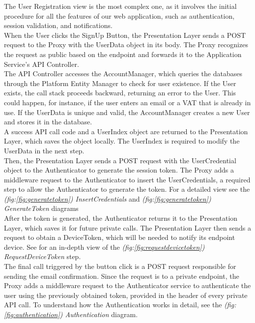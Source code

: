 The User Registration view is the most complex one, as it involves the initial procedure for all the features of our web application, such as authentication, session validation, and notifications.\\
When the User clicks the SignUp Button, the Presentation Layer sends a POST request to the Proxy with the UserData object in its body. The Proxy recognizes the request as public based on the endpoint and forwards it to the Application Service's API Controller.\\
The API Controller accesses the AccountManager, which queries the databases through the Platform Entity Manager to check for user existence. If the User exists, the call stack proceeds backward, returning an error to the User. This could happen, for instance, if the user enters an email or a VAT that is already in use. If the UserData is unique and valid, the AccountManager creates a new User and stores it in the database.\\
A success API call code and a UserIndex object are returned to the Presentation Layer, which saves the object locally. The UserIndex is required to modify the UserData in the next step.\\
Then, the Presentation Layer sends a POST request with the UserCredential object to the Authenticator to generate the session token. The Proxy adds a middleware request to the Authenticator to insert the UserCredentials, a required step to allow the Authenticator to generate the token. For a detailed view see the \textit{(fig:\ref{fig:generatetoken}) InsertCredentials} and \textit{(fig:\ref{fig:generatetoken}) GenerateToken} diagrams\\
After the token is generated, the Authenticator returns it to the Presentation Layer, which saves it for future private calls. The Presentation Layer then sends a request to obtain a DeviceToken, which will be needed to notify its endpoint device. See for an in-depth view of the \textit{(fig:\ref{fig:requestdevicetoken}) RequestDeviceToken} step.\\
The final call triggered by the button click is a POST request responsible for sending the email confirmation. Since the request is to a private endpoint, the Proxy adds a middleware request to the Authenticator service to authenticate the user using the previously obtained token, provided in the header of every private API call. To understand how the Authentication works in detail, see the \textit{(fig:\ref{fig:authentication}) Authentication} diagram.\\
